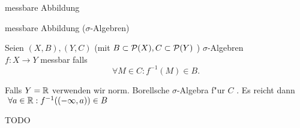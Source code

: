 \documentclass[class=article, crop=false]{standalone}
\begin{document}
\begin{zettel}{messbare Abbildung}
\begin{flashcard}[0nbob1oo]{messbare Abbildung  ($\sigma$-Algebren)}
	\begin{definition}
		Seien $(X,B), (Y,C)$ (mit $B \subset  \mathcal{P} (X), C \subset  \mathcal{P}(Y)$ ) $\sigma$-Algebren\\
		$f: X \to  Y$ messbar falls
		\[
			\forall M \in C : f^{-1}(M) \in B
		.\]
	\end{definition}
	\begin{remark}
		Falls $Y = \mathbb{R} $ verwenden wir norm. Borellsche $\sigma$-Algebra f"ur $C$ . Es reicht dann $\forall a \in \R : f^{-1}((-\infty, a)) \in B $
	\end{remark}
\end{flashcard}

\begin{lemma}[Eigenschaften]
	TODO
\end{lemma}
\end{zettel}
\end{document}
